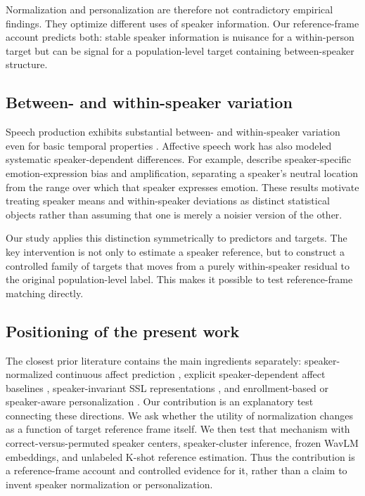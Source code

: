 \documentclass[11pt]{article}
\begin{document}
Normalization and personalization are therefore not contradictory empirical findings.
They optimize different uses of speaker information.
Our reference-frame account predicts both: stable speaker information is nuisance for a within-person target but can be signal for a population-level target containing between-speaker structure.

\subsection{Between- and within-speaker variation}

Speech production exhibits substantial between- and within-speaker variation even for basic temporal properties \citep{jacewicz2010tempo,quene2008multilevel}.
Affective speech work has also modeled systematic speaker-dependent differences.
For example, \citet{grimm2006modeling} describe speaker-specific emotion-expression bias and amplification, separating a speaker's neutral location from the range over which that speaker expresses emotion.
These results motivate treating speaker means and within-speaker deviations as distinct statistical objects rather than assuming that one is merely a noisier version of the other.

Our study applies this distinction symmetrically to predictors and targets.
The key intervention is not only to estimate a speaker reference, but to construct a controlled family of targets that moves from a purely within-speaker residual to the original population-level label.
This makes it possible to test reference-frame matching directly.

\subsection{Positioning of the present work}

The closest prior literature contains the main ingredients separately: speaker-normalized continuous affect prediction \citep{dang2016factor}, explicit speaker-dependent affect baselines \citep{grimm2006modeling}, speaker-invariant SSL representations \citep{gat2022speaker,ruggiero2025eta}, and enrollment-based or speaker-aware personalization \citep{triantafyllopoulos2024enrolment,shi2025speaker}.
Our contribution is an explanatory test connecting these directions.
We ask whether the utility of normalization changes as a function of target reference frame itself.
We then test that mechanism with correct-versus-permuted speaker centers, speaker-cluster inference, frozen WavLM embeddings, and unlabeled K-shot reference estimation.
Thus the contribution is a reference-frame account and controlled evidence for it, rather than a claim to invent speaker normalization or personalization.
\end{document}
